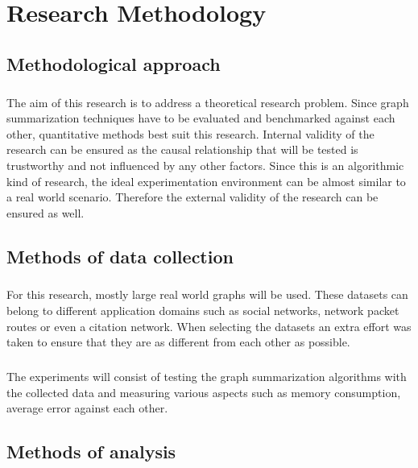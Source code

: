 \chapter{Research Methodology}

\section{Methodological approach}

\paragraph{}
The aim of this research is to address a theoretical research problem. Since  graph summarization techniques have to be evaluated and benchmarked against each other, quantitative methods best suit this research. Internal validity of the research can be ensured as the causal relationship that will be tested is trustworthy and not influenced by any other factors. Since this is an algorithmic kind of research, the ideal experimentation environment can be almost similar to a real world scenario. Therefore the external validity of the research can be ensured as well. 

\section{Methods of data collection}

\paragraph{}
For this research, mostly large real world graphs will be used. These datasets can belong to different application domains such as social networks, network packet routes or even a citation network. When selecting the datasets an extra effort was taken to ensure that they are as different from each other as possible. 

\paragraph{}
The experiments will consist of testing the graph summarization algorithms with the collected data and measuring various aspects such as memory consumption, average error against each other. 

\section{Methods of analysis}

